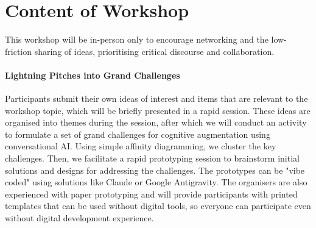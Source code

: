 \documentclass[manuscript,screen,review]{acmart}
\begin{document}

\section{Content of Workshop}

This workshop will be in-person only to encourage networking and the low-friction sharing of ideas, prioritising critical discourse and collaboration. 


\paragraph*{Lightning Pitches into Grand Challenges}
Participants submit their own ideas of interest and items that are relevant to the workshop topic, which will be briefly presented in a rapid session. These ideas are organised into themes during the session, after which we will conduct an activity to formulate a set of grand challenges for cognitive augmentation using conversational AI. Using simple affinity diagramming, we cluster the key challenges. Then, we facilitate a rapid prototyping session to brainstorm initial solutions and designs for addressing the challenges.
The prototypes can be "vibe coded" using solutions like Claude or Google Antigravity. 
The organisers are also experienced with paper prototyping and will provide participants with printed templates that can be used without digital tools, so everyone can participate even without digital development experience.
\end{document}
